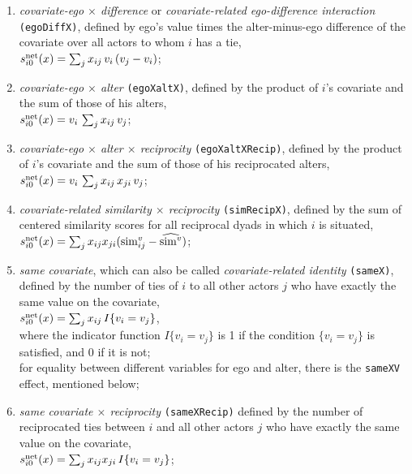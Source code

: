 \documentclass[a4paper,fleqn,11pt]{article}
\newcommand{\+}{\, + \,}
\newcommand{\vit}{\theenumi}
\begin{document}
\begin{enumerate}
 \item {\em covariate-ego $\times$ difference} or {\em covariate-related ego-difference interaction}
 \texttt{(egoDiffX)},
 defined by ego's value times the alter-minus-ego difference of the covariate over all actors
 to whom $i$ has a tie,\\
 $s^{\rm net}_{i\vit}(x) = \sum_j x_{ij}\, v_i \, (v_j - v_i)$;


 \item {\em covariate-ego $\times$ alter} \texttt{(egoXaltX)},
 defined by the product of $i$'s covariate and the sum of those of his alters,\\
 $s^{\rm net}_{i\vit}(x) = v_i \, \sum_j x_{ij}\, v_j $;

 \item {\em covariate-ego $\times$ alter $\times$ reciprocity}
 \texttt{(egoXaltXRecip)},
 defined by the product of $i$'s covariate and the sum of those
 of his reciprocated alters,\\
 $s^{\rm net}_{i\vit}(x) = v_i \, \sum_j x_{ij}\,x_{ji}\, v_j $;

 \item {\em covariate-related similarity $\times$ reciprocity}
 \texttt{(simRecipX)}, defined by
 the sum of centered similarity scores for all
 reciprocal dyads in which $i$ is situated,\\
 $s^{\rm net}_{i\vit}(x) = \sum_j x_{ij}x_{ji} ({\rm sim}^v_{ij} - \widehat{{\rm sim}^v}) $;

 \item \emph{same covariate}, which can also be called {\em covariate-related identity}
 \texttt{(sameX)},  defined by the
 number of ties of $i$ to all other actors $j$ who have
 exactly the same value on the covariate,\\
 $s^{\rm net}_{i\vit}(x) = \sum_j x_{ij}\, I\{v_i = v_j \} $,\\
 where the indicator function $I\{v_i = v_j \} $ is 1 if the condition $\{v_i = v_j \} $
 is satisfied, and 0 if it is not;\\
 for equality between different variables for ego and alter,
 there is the \texttt{sameXV} effect, mentioned below;

 \item {\em same covariate $\times$ reciprocity}
\texttt{(sameXRecip)} defined by the
 number of reciprocated ties between $i$ and all other actors $j$ who have
 exactly the same value on the covariate,\\
 $s^{\rm net}_{i\vit}(x) = \sum_j x_{ij} x_{ji}\, I\{v_i = v_j \} $;


\end{enumerate}
\end{document}

